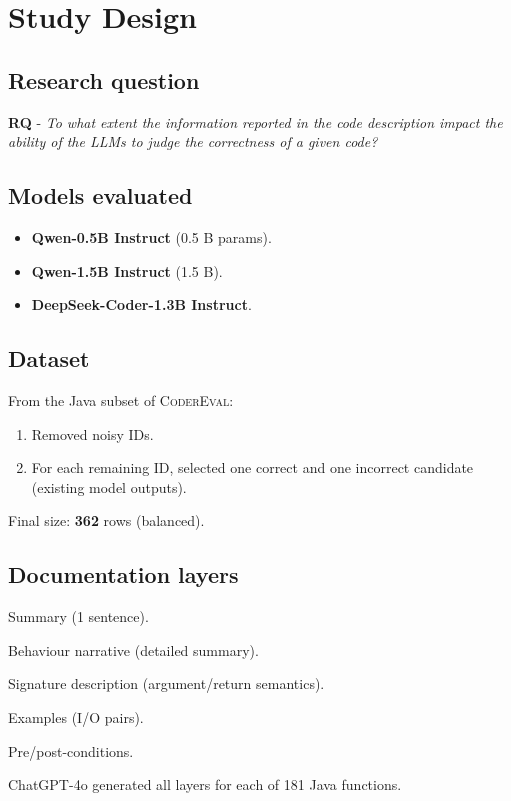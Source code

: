 \documentclass[a4paper]{usiinfbachelorproject}
\begin{document}
\section{Study Design}\label{sec:design}

\subsection*{Research question}
\noindent\textbf{RQ} -  
\emph{To what extent the information reported in the code description impact the ability of the LLMs to judge the correctness of a given code?}

\subsection{Models evaluated}\label{sec:models}
\begin{itemize}[leftmargin=12pt,itemsep=1pt]
  \item \textbf{Qwen-0.5B Instruct} (0.5 B params).  
  \item \textbf{Qwen-1.5B Instruct} (1.5 B).  
  \item \textbf{DeepSeek-Coder-1.3B Instruct}.  
\end{itemize}

\subsection{Dataset}\label{sec:dataset}
From the Java subset of \textsc{CoderEval}:
\begin{enumerate}[label=\alph*),leftmargin=14pt,itemsep=0pt]
  \item Removed noisy IDs.  
  \item For each remaining ID, selected one correct and one incorrect candidate (existing model outputs).  
\end{enumerate}
Final size: \textbf{362} rows (balanced).

\subsection{Documentation layers}\label{sec:layers}
\begin{description}[style=nextline,leftmargin=15pt]
  \item[L1] Summary (1 sentence).  
  \item[L2] Behaviour narrative (detailed summary).  
  \item[L3] Signature description (argument/return semantics).  
  \item[L4] Examples (I/O pairs).  
  \item[L5] Pre/post-conditions.  
\end{description}
ChatGPT-4o generated all layers for each of 181 Java functions.
\end{document}
